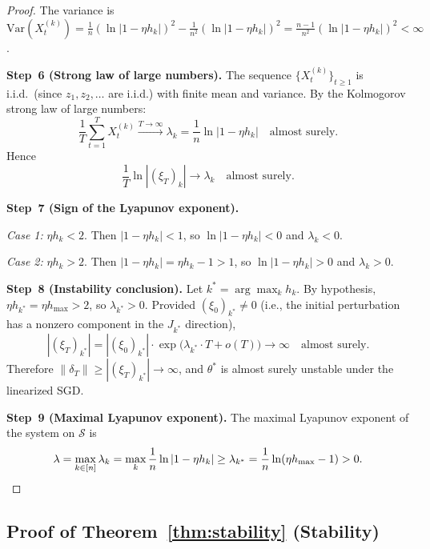 \documentclass[11pt,a4paper]{article}
\theoremstyle{definition}
\theoremstyle{remark}
\newcommand{\cS}{\mathcal{S}}
\begin{document}
\begin{proof}
The variance is
$\mathrm{Var}(X_t^{(k)})
= \frac{1}{n}(\ln|1 - \eta h_k|)^2 - \frac{1}{n^2}(\ln|1 - \eta h_k|)^2
= \frac{n-1}{n^2}(\ln|1 - \eta h_k|)^2 < \infty$.

\textbf{Step~6 (Strong law of large numbers).}\;
The sequence $\{X_t^{(k)}\}_{t \geq 1}$ is i.i.d.\ (since $z_1, z_2, \ldots$
are i.i.d.) with finite mean and variance.
By the Kolmogorov strong law of large numbers:
\[
  \frac{1}{T}\sum_{t=1}^{T} X_t^{(k)}
  \xrightarrow{T \to \infty} \lambda_k
  = \frac{1}{n}\ln|1 - \eta h_k|
  \quad \text{almost surely.}
\]
Hence
\[
  \frac{1}{T}\ln|(\xi_T)_k| \to \lambda_k
  \quad \text{almost surely.}
\]

\textbf{Step~7 (Sign of the Lyapunov exponent).}\;

\emph{Case 1:} $\eta h_k < 2$.
Then $|1 - \eta h_k| < 1$, so $\ln|1 - \eta h_k| < 0$ and $\lambda_k < 0$.

\emph{Case 2:} $\eta h_k > 2$.
Then $|1 - \eta h_k| = \eta h_k - 1 > 1$, so $\ln|1 - \eta h_k| > 0$ and
$\lambda_k > 0$.

\textbf{Step~8 (Instability conclusion).}\;
Let $k^* = \arg\max_k h_k$.  By hypothesis,
$\eta h_{k^*} = \eta h_{\max} > 2$, so $\lambda_{k^*} > 0$.
Provided $(\xi_0)_{k^*} \neq 0$ (i.e., the initial perturbation has a nonzero
component in the $J_{k^*}$ direction),
\[
  |(\xi_T)_{k^*}|
  = |(\xi_0)_{k^*}| \cdot \exp\!\bigl(\lambda_{k^*} \cdot T + o(T)\bigr)
  \to \infty
  \quad \text{almost surely.}
\]
Therefore $\|\delta_T\| \geq |(\xi_T)_{k^*}| \to \infty$, and $\theta^*$ is
almost surely unstable under the linearized SGD.

\textbf{Step~9 (Maximal Lyapunov exponent).}\;
The maximal Lyapunov exponent of the system on $\cS$ is
\[
  \lambda = \max_{k \in [n]} \lambda_k
  = \max_k \frac{1}{n}\ln|1 - \eta h_k|
  \geq \lambda_{k^*}
  = \frac{1}{n}\ln(\eta h_{\max} - 1) > 0. \qedhere
\]
\end{proof}

\subsection{Proof of Theorem~\ref{thm:stability} (Stability)}
\end{document}
